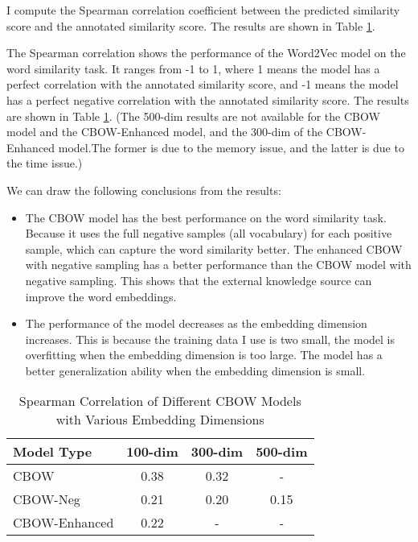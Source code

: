 \documentclass[UTF8,a4paper,12pt]{article}
\begin{document}
I compute the Spearman correlation
coefficient between the predicted similarity score and the annotated similarity score. The results are shown in Table \ref{tab:cbow_results}.

The Spearman correlation shows the performance of the Word2Vec model on the word similarity task. It ranges from -1 to 1, where 1 means the model has a perfect correlation with the annotated similarity score, and -1 means the model has a perfect negative correlation with the annotated similarity score. The results are shown in Table \ref{tab:cbow_results}. (The 500-dim results are not available for the CBOW model and the CBOW-Enhanced model, and the 300-dim of the CBOW-Enhanced model.The former is due to the memory issue, and the latter is due to the time issue.) 

We can draw the following conclusions from the results:
\begin{itemize}
    \item The CBOW model has the best performance on the word similarity task. Because it uses the full negative samples (all vocabulary) for each positive sample, which can capture the word similarity better. The enhanced CBOW with negative sampling has a better performance than the CBOW model with negative sampling. This shows that the external knowledge source can improve the word embeddings.
    \item The performance of the model decreases as the embedding dimension increases. This is because the training data I use is two small, the model is overfitting when the embedding dimension is too large. The model has a better generalization ability when the embedding dimension is small.
\end{itemize}

\begin{table}[htbp]
    \centering
    \caption{\quad Spearman Correlation of Different CBOW Models with Various Embedding Dimensions}
    \label{tab:cbow_results}
    \begin{tabular}{lccc}
    \toprule
    \textbf{Model Type} & \textbf{100-dim} & \textbf{300-dim} & \textbf{500-dim} \\
    \midrule
    CBOW            & 0.38         & 0.32         & -          \\
    CBOW-Neg        & 0.21         & 0.20         & 0.15       \\
    CBOW-Enhanced   & 0.22         & -         & -          \\
    \bottomrule
    \end{tabular}
\end{table}
\end{document}
